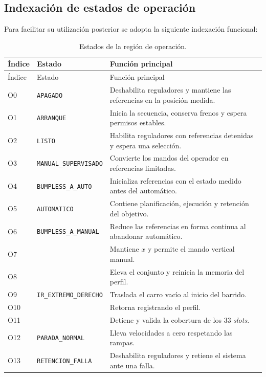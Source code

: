\documentclass[a4paper,10pt,onecolumn,journal]{ieeeconf}
\numberwithin{equation}{section}
\begin{document}
\subsection{Indexación de estados de operación}
Para facilitar su utilización posterior se adopta la siguiente indexación funcional:
\begin{longtable}{C{1.2cm} L{4.4cm} L{8.2cm}}
\caption{Estados de la región de operación.}\\
\toprule
Índice & Estado & Función principal\\
\midrule
\endfirsthead
\toprule
Índice & Estado & Función principal\\
\midrule
\endhead
O0 & \texttt{APAGADO} & Deshabilita reguladores y mantiene las referencias en la posición medida.\\
O1 & \texttt{ARRANQUE} & Inicia la secuencia, conserva frenos y espera permisos estables.\\
O2 & \texttt{LISTO} & Habilita reguladores con referencias detenidas y espera una selección.\\
O3 & \texttt{MANUAL\_SUPERVISADO} & Convierte los mandos del operador en referencias limitadas.\\
O4 & \texttt{BUMPLESS\_A\_AUTO} & Inicializa referencias con el estado medido antes del automático.\\
O5 & \texttt{AUTOMATICO} & Contiene planificación, ejecución y retención del objetivo.\\
O6 & \texttt{BUMPLESS\_A\_MANUAL} & Reduce las referencias en forma continua al abandonar automático.\\
O7 &  & Mantiene $x$ y permite el mando vertical manual.\\
O8 &  & Eleva el conjunto y reinicia la memoria del perfil.\\
O9 & \texttt{IR\_EXTREMO\_DERECHO} & Traslada el carro vacío al inicio del barrido.\\
O10 &  & Retorna registrando el perfil.\\
O11 &  & Detiene y valida la cobertura de los 33 \textit{slots}.\\
O12 & \texttt{PARADA\_NORMAL} & Lleva velocidades a cero respetando las rampas.\\
O13 & \texttt{RETENCION\_FALLA} & Deshabilita reguladores y retiene el sistema ante una falla.\\
\bottomrule
\end{longtable}
\end{document}
